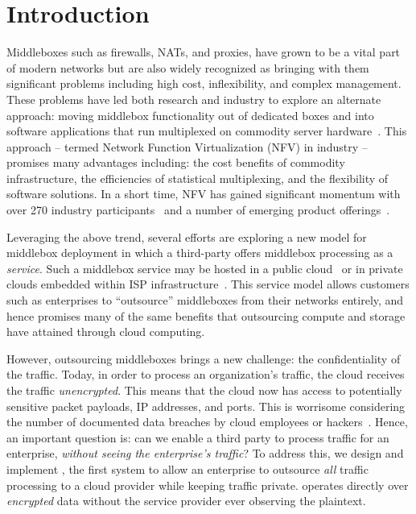 \section{Introduction}\label{sec:intro}

Middleboxes such as firewalls, NATs, and proxies, have grown to be a vital part of modern networks but are 
also widely recognized as bringing  with them significant problems including high cost, inflexibility, and complex management.  
These problems have led both research and industry to explore an alternate approach: moving middlebox functionality out of dedicated boxes and into 
software applications that run multiplexed on commodity server hardware~\cite{mb-manifesto,comb,aplomb,opennf,clickos,flowtags,nfv,domain20,opnfv}.
This approach -- termed Network Function Virtualization (NFV) in industry -- promises many advantages including: the cost benefits of commodity infrastructure, 
the efficiencies of statistical multiplexing, and the flexibility of software solutions. 
In a short time, NFV has gained significant momentum with over 270 industry participants~\cite{etsi-nfv} and a number of emerging product offerings~\cite{something}.

Leveraging the above trend, several efforts are exploring a new model for middlebox deployment in which a third-party offers middlebox processing as a  
\emph{service}.
Such a middlebox service may be hosted in a public cloud~\cite{aplomb,zscalar,aryaka} or in private clouds embedded within ISP 
infrastructure~\cite{domain20, telefonica}.  
This service model allows customers such as enterprises to ``outsource'' middleboxes from their networks entirely, and hence promises many of the same 
benefits that outsourcing compute and storage have attained through cloud computing.%

However, outsourcing middleboxes brings a new challenge: the confidentiality of the traffic. 
Today, in order to process an organization's traffic, the cloud receives the traffic {\em unencrypted}.  This means that the cloud 
now has access to potentially sensitive packet payloads,  IP addresses, and ports. This is 
worrisome considering the number of documented data breaches by cloud employees or hackers~\cite{PrivacyRecords}.
Hence, an important question is: can we enable a third party to process traffic for an enterprise, {\em without seeing the enterprise's traffic}?
To address this, we design and implement \sys, the first system to allow an enterprise to outsource {\it all} traffic processing to a cloud provider while keeping traffic private. 
\sys operates directly over {\it encrypted} data without the service provider ever observing the plaintext.


